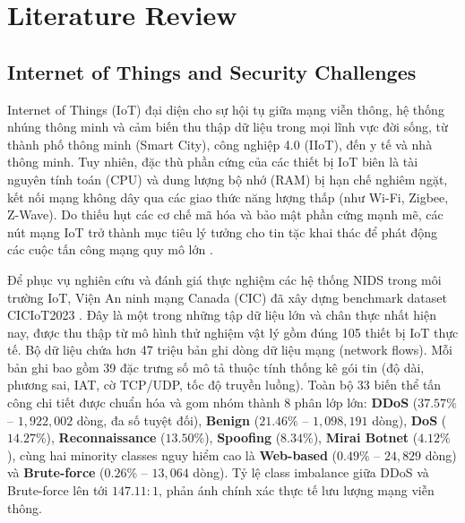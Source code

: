 \chapter{Literature Review}
\label{chap:literature}

\section{Internet of Things and Security Challenges}
\label{sec:lit_iot}
Internet of Things (IoT) đại diện cho sự hội tụ giữa mạng viễn thông, hệ thống nhúng thông minh và cảm biến thu thập dữ liệu trong mọi lĩnh vực đời sống, từ thành phố thông minh (Smart City), công nghiệp 4.0 (IIoT), đến y tế và nhà thông minh. Tuy nhiên, đặc thù phần cứng của các thiết bị IoT biên là tài nguyên tính toán (CPU) và dung lượng bộ nhớ (RAM) bị hạn chế nghiêm ngặt, kết nối mạng không dây qua các giao thức năng lượng thấp (như Wi-Fi, Zigbee, Z-Wave). Do thiếu hụt các cơ chế mã hóa và bảo mật phần cứng mạnh mẽ, các nút mạng IoT trở thành mục tiêu lý tưởng cho tin tặc khai thác để phát động các cuộc tấn công mạng quy mô lớn \cite{dadkhah2024ciciomt2024}.

Để phục vụ nghiên cứu và đánh giá thực nghiệm các hệ thống NIDS trong môi trường IoT, Viện An ninh mạng Canada (CIC) đã xây dựng benchmark dataset CICIoT2023 \cite{neto2023ciciot2023}. Đây là một trong những tập dữ liệu lớn và chân thực nhất hiện nay, được thu thập từ mô hình thử nghiệm vật lý gồm đúng 105 thiết bị IoT thực tế. Bộ dữ liệu chứa hơn 47 triệu bản ghi dòng dữ liệu mạng (network flows). Mỗi bản ghi bao gồm 39 đặc trưng số mô tả thuộc tính thống kê gói tin (độ dài, phương sai, IAT, cờ TCP/UDP, tốc độ truyền luồng). Toàn bộ 33 biến thể tấn công chi tiết được chuẩn hóa và gom nhóm thành 8 phân lớp lớn: \textbf{DDoS} ($37.57\%$ -- $1,922,002$ dòng, đa số tuyệt đối), \textbf{Benign} ($21.46\%$ -- $1,098,191$ dòng), \textbf{DoS} ($14.27\%$), \textbf{Reconnaissance} ($13.50\%$), \textbf{Spoofing} ($8.34\%$), \textbf{Mirai Botnet} ($4.12\%$), cùng hai minority classes nguy hiểm cao là \textbf{Web-based} ($0.49\%$ -- $24,829$ dòng) và \textbf{Brute-force} ($0.26\%$ -- $13,064$ dòng). Tỷ lệ class imbalance giữa DDoS và Brute-force lên tới $147.11:1$, phản ánh chính xác thực tế lưu lượng mạng viễn thông.

